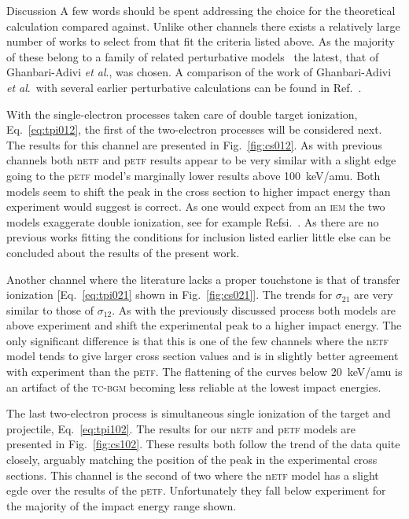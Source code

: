 \documentclass[aps, pra, reprint, groupedaddress, amsfonts, longbibliography,
               amsmath, amssymb, showpacs, nofootinbib]{revtex4-1}
\begin{document}
\begin{section}{Discussion \label{sec:disc}}
   A few words should be spent addressing the choice for the theoretical calculation compared against.
   Unlike other channels there exists a relatively large number of works to select from that fit the
   criteria listed above. As the majority of these belong to a family of related perturbative
   models~\cite{Mancev96, BOC05, Mancev-07, MG-10, NTC11, GG-12b, GAG15} the latest, that of
   Ghanbari-Adivi \textit{et al}., was chosen. A comparison of the work of Ghanbari-Adivi
   \textit{et al}.\ with several earlier perturbative calculations can be found in Ref.~\cite{GAG15}.

   With the single-electron processes taken care of double target ionization, Eq.~\eqref{eq:tpi012},
   the first of the two-electron processes will be considered next. The results for this channel are
   presented in Fig.~\ref{fig:cs012}. As with previous channels both n\textsc{etf} and p\textsc{etf}
   results appear to be very similar with a slight edge going to the p\textsc{etf} model's marginally
   lower results above 100~keV/amu. Both models seem to shift the peak in the cross section to higher
   impact energy than experiment would suggest is correct. As one would expect from an \textsc{iem}
   the two models exaggerate double ionization, see for example Refsi.~\cite{pbarhe-rev, p-he2p-he}. As
   there are no previous works fitting the conditions for inclusion listed earlier little else can be
   concluded about the results of the present work.

   Another channel where the literature lacks a proper touchstone is that of transfer ionization
   [Eq.~\eqref{eq:tpi021} shown in Fig.~\ref{fig:cs021}]. The trends for $\sigma_{21}$ are very similar
   to those of $\sigma_{12}$. As with the previously discussed process both models are above experiment
   and shift the experimental peak to a higher impact energy. The only significant difference is that
   this is one of the few channels where the n\textsc{etf} model tends to give larger cross section
   values and is in slightly better agreement with experiment than the p\textsc{etf}. The flattening of
   the curves below 20~keV/amu is an artifact of the \textsc{tc-bgm} becoming less reliable at the
   lowest impact energies.

   The last two-electron process is simultaneous single ionization of the target and projectile,
   Eq.~\eqref{eq:tpi102}. The results for our n\textsc{etf} and p\textsc{etf} models are presented in
   Fig.~\ref{fig:cs102}. These results both follow the trend of the data quite closely, arguably
   matching the position of the peak in the experimental cross sections. This channel is the second of
   two where the n\textsc{etf} model has a slight egde over the results of the p\textsc{etf}.
   Unfortunately they fall below experiment for the majority of the impact energy range shown.


\end{section}
\end{document}

